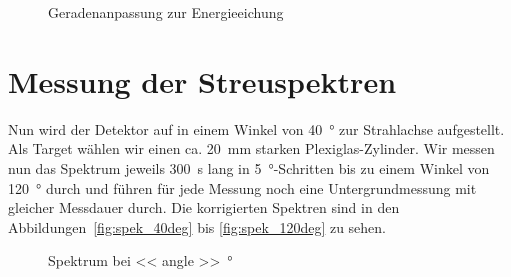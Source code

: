 \documentclass[11pt, ngerman, fleqn, DIV=15, headinclude, BCOR=2cm]{scrreprt}
\begin{document}
\begin{figure}
    \centering
    \caption{%
        Geradenanpassung zur Energieeichung
    }
    \label{fig:energieeichung}
\end{figure}

\FloatBarrier
\section{Messung der Streuspektren}

Nun wird der Detektor auf in einem Winkel von \SI{40}{\degree} zur Strahlachse
aufgestellt. Als Target wählen wir einen ca. \SI{20}{\milli\meter} starken
Plexiglas-Zylinder. Wir messen nun das Spektrum
jeweils \SI{300}{\second} lang in \SI{5}{\degree}-Schritten bis zu einem Winkel
von \SI{120}{\degree} durch und führen für jede Messung noch eine
Untergrundmessung mit gleicher Messdauer durch. Die korrigierten Spektren sind
in den Abbildungen~\ref{fig:spek_40deg} bis \ref{fig:spek_120deg} zu sehen.

\begin{figure}
    \centering
    \caption{%
        Spektrum bei \SI{<< angle >>}{\degree}
    }
    \label{fig:spek_<< angle >>deg}
\end{figure}
\end{document}
